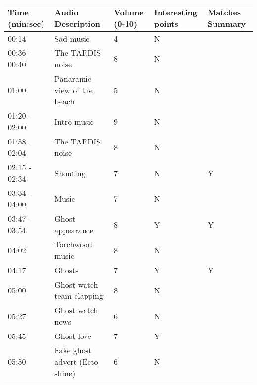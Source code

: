 \begin{longtable}{| p{70pt} | p{130pt} | p{45pt} | p{57pt} | p{60pt}|}
\hline
\textbf{Time (min:sec)} & \textbf{Audio Description} & \textbf{Volume (0-10)} &\textbf{ Interesting points} & \textbf{Matches Summary}\\ \hline
00:14           &           Sad music           &           4           &           N          &           \\\hline
00:36 - 00:40           &           The TARDIS noise           &           8           &           N          &           \\\hline
01:00           &           Panaramic view of the beach           &           5           &           N          &           \\\hline
01:20 - 02:00           &           Intro music           &           9           &           N          &           \\\hline
01:58 - 02:04           &           The TARDIS noise           &           8           &           N          &           \\\hline
02:15 - 02:34           &           Shouting           &           7           &           N          &Y           \\\hline
03:34 - 04:00           &           Music           &           7            &           N          &           \\\hline
03:47 - 03:54           &           Ghost appearance           &           8           &           Y          &Y           \\\hline
04:02           &           Torchwood music           &           8           &           N          &           \\\hline
04:17           &           Ghosts           &           7           &           Y          &Y           \\\hline
05:00           &           Ghost watch team clapping           &           8           &           N          &           \\\hline
05:27           &           Ghost watch news           &           6           &           N          &           \\\hline
05:45           &           Ghost love           &           7           &           Y          &           \\\hline
05:50           &           Fake ghost advert (Ecto shine)           &           6           &           N          &           \\\hline

\end{longtable}
